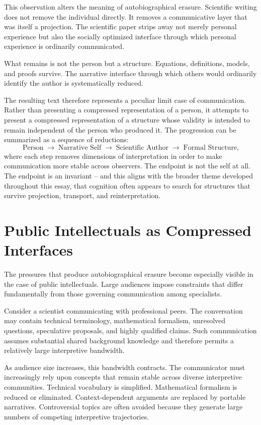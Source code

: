 \documentclass[11pt]{article}
\theoremstyle{plain}
\begin{document}
This observation alters the meaning of autobiographical erasure. Scientific writing does not remove the individual directly. It removes a communicative layer that was itself a projection. The scientific paper strips away not merely personal experience but also the socially optimized interface through which personal experience is ordinarily communicated.

What remains is not the person but a structure. Equations, definitions, models, and proofs survive. The narrative interface through which others would ordinarily identify the author is systematically reduced.

The resulting text therefore represents a peculiar limit case of communication. Rather than presenting a compressed representation of a person, it attempts to present a compressed representation of a structure whose validity is intended to remain independent of the person who produced it. The progression can be summarized as a sequence of reductions:
\[
\text{Person} \;\longrightarrow\; \text{Narrative Self} \;\longrightarrow\; \text{Scientific Author} \;\longrightarrow\; \text{Formal Structure,}
\]
where each step removes dimensions of interpretation in order to make communication more stable across observers. The endpoint is not the self at all. The endpoint is an invariant -- and this aligns with the broader theme developed throughout this essay, that cognition often appears to search for structures that survive projection, transport, and reinterpretation.

\section{Public Intellectuals as Compressed Interfaces}

The pressures that produce autobiographical erasure become especially visible in the case of public intellectuals. Large audiences impose constraints that differ fundamentally from those governing communication among specialists.

Consider a scientist communicating with professional peers. The conversation may contain technical terminology, mathematical formalism, unresolved questions, speculative proposals, and highly qualified claims. Such communication assumes substantial shared background knowledge and therefore permits a relatively large interpretive bandwidth.

As audience size increases, this bandwidth contracts. The communicator must increasingly rely upon concepts that remain stable across diverse interpretive communities. Technical vocabulary is simplified. Mathematical formalism is reduced or eliminated. Context-dependent arguments are replaced by portable narratives. Controversial topics are often avoided because they generate large numbers of competing interpretive trajectories.
\end{document}
